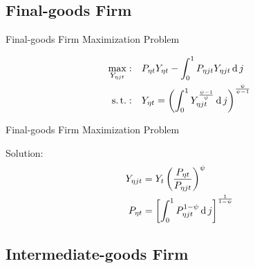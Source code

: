 \documentclass[../quali_slides.tex]{subfiles}
\begin{document}
\subsection{Final-goods Firm}


\begin{frame}{Final-goods Firm Maximization Problem}
	
\begin{align}
	\max_{Y_{\eta jt}}: &\quad P_{\eta t} Y_{\eta t} - \int_{0}^{1} P_{\eta jt} Y_{\eta jt} \operatorname{d} j \label{eq_v2:reg-final-goods-firm-max-problem} \\
	\operatorname{s.t.}: & \quad Y_{\eta t} = \left( \int_{0}^{1} Y_{\eta jt}^{\frac{\psi-1}{\psi}} \operatorname{d} j \right)^{\frac{\psi}{\psi-1}} \label{eq_v2:reg-final-goods-firm-bundle-rule}
\end{align}
	
\end{frame}


\begin{frame}{Final-goods Firm Maximization Problem}
	
Solution:
\begin{align}
	Y_{\eta jt} &= Y_{t} \left( \frac{P_{\eta t}}{P_{\eta jt}} \right)^{\psi} \label{eq_v2:reg-final-goods-firm-FOC} \\
	P_{\eta t} & = \left[ \int_{0}^{1} P_{\eta jt}^{1-\psi} \operatorname{d} j \right]^{\frac{1}{1-\psi}} \label{eq_v2:reg-final-goods-firm-markup}
\end{align}


	
\end{frame}


\subsection{Intermediate-goods Firm}
\end{document}
